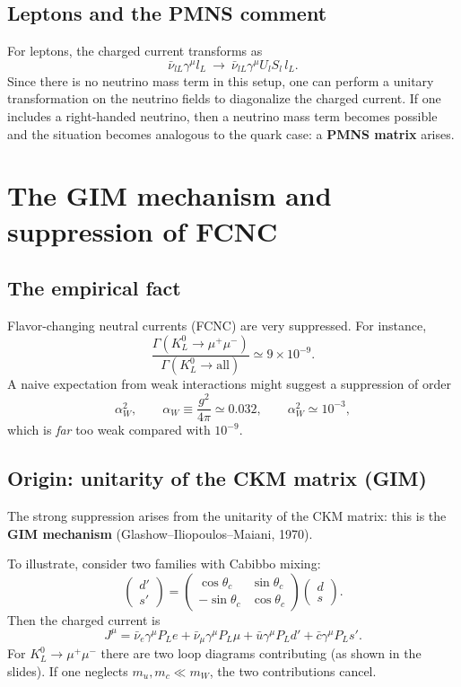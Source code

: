 \subsection{Leptons and the PMNS comment}
For leptons, the charged current transforms as
\begin{equation}
\bar\nu_{lL}\gamma^\mu l_L \ \longrightarrow\ \bar\nu_{lL}\gamma^\mu U_l S_l\,l_L.
\end{equation}
Since there is no neutrino mass term in this setup, one can perform a unitary transformation on the neutrino fields to diagonalize the charged current.
If one includes a right-handed neutrino, then a neutrino mass term becomes possible and the situation becomes analogous to the quark case: a \textbf{PMNS matrix} arises.

\section{The GIM mechanism and suppression of FCNC}
\subsection{The empirical fact}
Flavor-changing neutral currents (FCNC) are very suppressed. For instance,
\begin{equation}
\frac{\Gamma(K_L^0\to \mu^+\mu^-)}{\Gamma(K_L^0\to \text{all})}\simeq 9\times 10^{-9}.
\end{equation}
A naive expectation from weak interactions might suggest a suppression of order
\[
\alpha_W^2,
\qquad
\alpha_W\equiv \frac{g^2}{4\pi}\simeq 0.032,
\qquad
\alpha_W^2\simeq 10^{-3},
\]
which is \emph{far} too weak compared with $10^{-9}$.

\subsection{Origin: unitarity of the CKM matrix (GIM)}
The strong suppression arises from the unitarity of the CKM matrix: this is the \textbf{GIM mechanism} (Glashow--Iliopoulos--Maiani, 1970).

To illustrate, consider two families with Cabibbo mixing:
\begin{equation}
\begin{pmatrix}d'\\ s'\end{pmatrix}
=
\begin{pmatrix}
\cos\theta_c & \sin\theta_c\\
-\sin\theta_c & \cos\theta_c
\end{pmatrix}
\begin{pmatrix}d\\ s\end{pmatrix}.
\end{equation}
Then the charged current is
\begin{equation}
J^\mu
=
\bar\nu_e\gamma^\mu P_L e+\bar\nu_\mu\gamma^\mu P_L \mu
+\bar u\gamma^\mu P_L d'
+\bar c\gamma^\mu P_L s'.
\end{equation}
For $K_L^0\to \mu^+\mu^-$ there are two loop diagrams contributing (as shown in the slides).
If one neglects $m_u,m_c\ll m_W$, the two contributions cancel.

